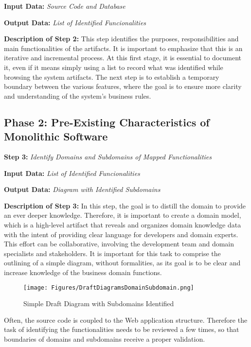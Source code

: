 \documentclass[a4paper,twoside]{article}
\begin{document}
\textbf{Input Data:}
\textit{Source Code and Database}

\textbf{Output Data:}
\textit{List of Identified Funcionalities}

\textbf{Description of Step 2:}
This step identifies the purposes, responsibilities and main functionalities of the artifacts. It is important to emphasize that this is an iterative and incremental process. At this first stage, it is essential to document it, even if it means simply using a list to record what was identified while browsing the system artifacts. The next step is to establish a temporary boundary between the various features, where the goal is to ensure more clarity and understanding of the system's business rules.

\subsection{Phase 2: Pre-Existing Characteristics of Monolithic Software}

\noindent
\textbf{Step 3:}
\textit{Identify Domains and Subdomains of Mapped Functionalities}

\textbf{Input Data:}
\textit{List of Identified Funcionalities}

\textbf{Output Data:}
\textit{Diagram with Identified Subdomains}

\textbf{Description of Step 3:}
In this step, the goal is to distill the domain to provide an ever deeper knowledge. Therefore, it is important to create a domain model, which is a high-level artifact that reveals and organizes domain knowledge data with the intent of providing clear language for developers and domain experts. This effort
can be collaborative, involving the development team and domain specialists and stakeholders. It is important for this task to comprise the outlining of a simple diagram, without formalities, as its goal is to be clear and increase knowledge of the business domain functions.

\begin{figure}
\centering
\texttt{[image: Figures/DraftDiagramsDomainSubdomain.png]}
\caption{Simple Draft Diagram with Subdomains Identified}
\label{fig:DraftDiagramsDomainSubdomain}
\end{figure}

Often, the source code is coupled to the Web application structure. Therefore the task of identifying the functionalities needs to be reviewed a few times, so that boundaries of domains and subdomains receive a proper validation.
\end{document}
